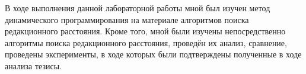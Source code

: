 \Conclusion

В ходе выполнения данной лабораторной работы мной был изучен метод динамического программирования на материале алгоритмов поиска редакционного расстояния. Кроме того, мной были изучены непосредственно алгоритмы поиска редакционного расстояния, проведён их анализ, сравнение, проведены эксперименты, в ходе которых были подтверждены полученные в ходе анализа тезисы.

